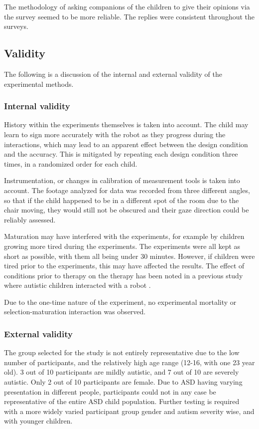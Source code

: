 The methodology of asking companions of the children to give their opinions via the survey seemed to be more reliable. The replies were consistent throughout the surveys.


\subsection{Validity}

The following is a discussion of the internal and external validity of the experimental methods.


\subsubsection{Internal validity}

History within the experiments themselves is taken into account. The child may learn to sign more accurately with the robot as they progress during the interactions, which may lead to an apparent effect between the design condition and the accuracy. This is mitigated by repeating each design condition three times, in a randomized order for each child.

Instrumentation, or changes in calibration of measurement tools is taken into account. The footage analyzed for data was recorded from three different angles, so that if the child happened to be in a different spot of the room due to the chair moving, they would still not be obscured and their gaze direction could be reliably assessed.

Maturation may have interfered with the experiments, for example by children growing more tired during the experiments. The experiments were all kept as short as possible, with them all being under 30 minutes. However, if children were tired prior to the experiments, this may have affected the results. The effect of conditions prior to therapy on the therapy has been noted in a previous study where autistic children interacted with a robot \cite{robins2004effects}.

Due to the one-time nature of the experiment, no experimental mortality or selection-maturation interaction was observed.


\subsubsection{External validity}

The group selected for the study is not entirely representative due to the low number of participants, and the relatively high age range (12-16, with one 23 year old). 3 out of 10 participants are mildly autistic, and 7 out of 10 are severely autistic. Only 2 out of 10 participants are female. Due to ASD having varying presentation in different people, participants could not in any case be representative of the entire ASD child population. Further testing is required with a more widely varied participant group gender and autism severity wise, and with younger children.

